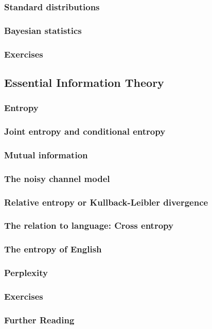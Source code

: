 \documentclass[a4paper]{article}
\begin{document}
\subsubsection{Standard distributions}
\subsubsection{Bayesian statistics}
\subsubsection{Exercises}
\subsection{Essential Information Theory}
\subsubsection{Entropy}
\subsubsection{Joint entropy and conditional entropy}
\subsubsection{Mutual information}
\subsubsection{The noisy channel model}
\subsubsection{Relative entropy or Kullback-Leibler divergence}
\subsubsection{The relation to language: Cross entropy}
\subsubsection{The entropy of English}
\subsubsection{Perplexity}
\subsubsection{Exercises}
\subsubsection{Further Reading}
\newpage
\end{document}
